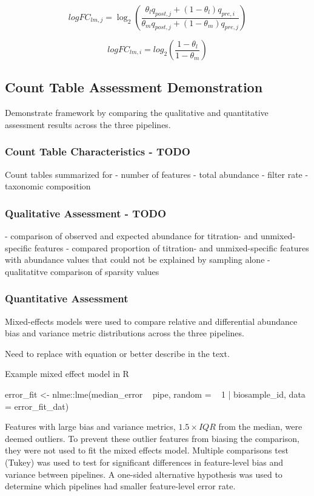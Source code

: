 \documentclass[linenumbers]{bmcart}
\begin{document}
\begin{equation}
      logFC_{lm,j} = \log_2\left(\frac{\theta_l q_{post,j} + (1 - \theta_l) q_{pre,i}}{\theta_m q_{post,j} + (1 - \theta_m) q_{pre,j}}\right)
  \label{eq:expLogFC}
\end{equation}

\begin{equation}
      logFC_{lm,i} = log_2\left(\frac{1-\theta_l}{1-\theta_m}\right)
  \label{eq:expPreLogFC}
\end{equation}


\subsection*{Count Table Assessment Demonstration}
Demonstrate framework by comparing the qualitative and quantitative assessment results across the three pipelines.

\subsubsection{Count Table Characteristics - TODO}
Count tables summarized for
- number of features
- total abundance
- filter rate
- taxonomic composition

\subsubsection{Qualitative Assessment - TODO}
- comparison of observed and expected abundance for titration- and unmixed-specific features
- compared proportion of titration- and unmixed-specific features with abundance values that could not be explained by sampling alone
- qualitatitve comparison of sparsity values

\subsubsection{Quantitative Assessment}
Mixed-effects models were used to compare relative and differential abundance bias and variance metric distributions across the three pipelines.

Need to replace with equation or better describe in the text.
\begin{verbatim*}
Example mixed effect model in R

error_fit <- nlme::lme(median_error ~ pipe, random =  ~ 1 | biosample_id, data = error_fit_dat)
\end{verbatim*}

Features with large bias and variance metrics, \(1.5\times IQR\) from the median,
were deemed outliers. To prevent these outlier features from biasing the
comparison, they were not used to fit the mixed effects model. Multiple
comparisons test (Tukey) was used to test for significant differences in
feature-level bias and variance between pipelines. A one-sided
alternative hypothesis was used to determine which pipelines had smaller
feature-level error rate.
\end{document}
